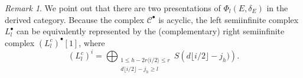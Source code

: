 \documentclass[11pt]{amsart}
\theoremstyle{definition} %
\theoremstyle{remark} %
\newtheorem{rem}[thm]{Remark}%
\newcommand{\ZZ}{\mathbb Z}
\newcommand{\Ccal}{\mathcal C}
\newcommand{\Pcal}{\mathcal P}
\newcommand{\Sing}{\operatorname{Sing}}
\newcommand{\gr}{\operatorname{gr-}}
\newcommand{\cC}{\mathcal{C}}
\begin{document}

\begin{rem}\label{rem:rightsemiinf}
We point out that there are two presentations of 
$\Phi_l(E,\delta_E)$ in the derived category. 
Because the complex $\cC^\bullet$ is acyclic, 
the left semiinfinite complex $L_l^\bullet$ can be 
equivalently represented by 
the (complementary) right semiinfinite complex 
$(L_l^c)^{\bullet}[1]$, where  
\begin{equation}
\label{eq:Lac}
(L_l^c)^i=\bigoplus_{\substack{{1\le h-2r\langle {i}/2\rangle\le r } 
\\{d\lfloor i/2\rfloor -j_h\ge l}}} 
S\left(d\lfloor i/2\rfloor -j_h)\right).
\end{equation}
\end{rem}
\end{document}
